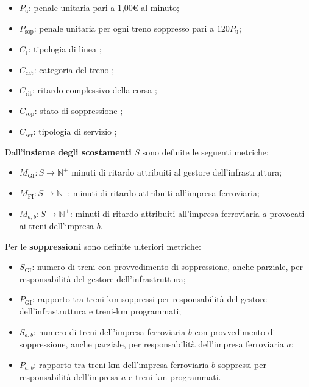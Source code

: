 \documentclass[12pt,a4paper,italian]{report}
\begin{document}
\begin{itemize}
	\item $P_\text{u}$: penale unitaria pari a 1,00€ al minuto;
	\item $P_\text{sop}$: penale unitaria per ogni treno soppresso
    pari a $120 P_\text{u}$;
	\item $C_\text{t}$: tipologia di linea \cite[app.\ 5C, tabella
    1]{RfiPir};
	\item $C_\text{cat}$: categoria del treno \cite[app.\ 5C, tabella
    4]{RfiPir};
	\item $C_\text{rit}$: ritardo complessivo della corsa \cite[app.\
    5C, tabelle 2a, 2b, 2c]{RfiPir};
	\item $C_\text{sop}$: stato di soppressione \cite[app.\ 5C,
    tabella 6]{RfiPir};
	\item $C_\text{ser}$: tipologia di servizio \cite[app.\ 5C,
    tabella 3]{RfiPir};
\end{itemize}

Dall'\textbf{insieme degli scostamenti} $S$ sono definite le seguenti
metriche:

\begin{itemize}
	\item $M_\text{GI} : S \rightarrow \mathbb N^+$ minuti di ritardo
    attribuiti al gestore dell'infrastruttura;
	\item $M_\text{FI} : S \rightarrow \mathbb N^+$: minuti di ritardo
    attribuiti all'impresa ferroviaria;
	\item $M_{a, b} : S \rightarrow \mathbb N^+$: minuti di ritardo
    attribuiti all'impresa ferroviaria $a$ provocati ai treni
    dell'impresa $b$.
\end{itemize}

Per le \textbf{soppressioni} sono definite ulteriori metriche:
\begin{itemize}
	\item $S_\text{GI}$: numero di treni con provvedimento di
    soppressione, anche parziale, per responsabilità del gestore
    dell'infrastruttura;
	\item $P_\text{GI}$: rapporto tra treni-km soppressi per
    responsabilità del gestore dell'infrastruttura e treni-km
    programmati;
	\item $S_{a, b}$: numero di treni dell'impresa ferroviaria $b$ con
    provvedimento di soppressione, anche parziale, per responsabilità
    dell'impresa ferroviaria $a$;
	\item $P_{a, b}$: rapporto tra treni-km dell'impresa ferroviaria
    $b$ soppressi per responsabilità dell'impresa $a$ e treni-km
    programmati.
\end{itemize}
\end{document}
